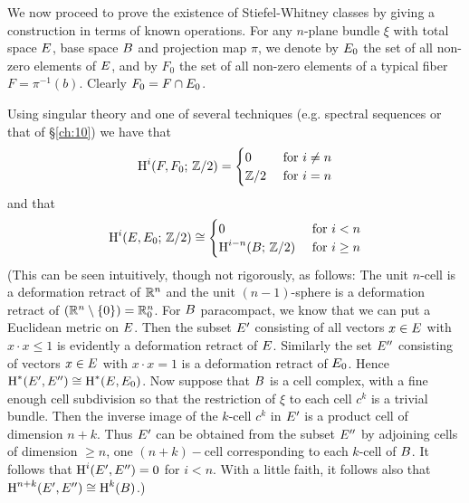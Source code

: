 \documentclass[../main]{subfiles}
\begin{document}
We now proceed to prove the existence of Stiefel-Whitney classes by giving a construction in terms of known operations. For any $n$-plane bundle $\xi$ with total space $E$, base space $B $ and projection map $\pi$, we denote by $E_{0}$ the set of all non-zero elements of $E$, and by $F_{0}$ the set of all non-zero elements of a typical fiber $F=\pi^{-1}(b)$. Clearly $F_{0}= F \cap E_{0}$.

Using singular theory and one of several techniques (e.g. spectral sequences or that of \S\ref{ch:10}) we have that 
\[\operatorname{H}^{i}(F, F_{0} ;\, \mathbb{Z} / 2)=\begin{cases}
	0 &\text { for } i \neq  n  \\
	\mathbb{Z} / 2 &\text { for } i= n 
	\end{cases}
\]
and that
\[\operatorname{H}^{i}(E, E_{0} ; \, \mathbb{Z} / 2)\cong\begin{cases}
	0& \text { for } i<n  \\
	\operatorname{H}^{i-n}(B  ; \, \mathbb{Z} / 2)& \text { for } i \geq  n  
\end{cases}
\]
(This can be seen intuitively, though not rigorously, as follows: The unit $n$-cell is a deformation retract of $\mathbb R^{n}$ and the unit $(n-1)$-sphere is a deformation retract of $(\mathbb R^{ n }\setminus\{0\})=\mathbb R_{0}^{ n } $. For $B $ paracompact, we know that we can put a Euclidean metric on $E$. Then the subset $E^{\prime}$ consisting of all vectors $x \in E$ with $x \cdot x \leq 1$ is evidently a deformation retract of $E$. Similarly the set $E^{\prime \prime}$ consisting of vectors $x \in E$ with $x \cdot x=1$ is a deformation retract of $E_{0} $. Hence $\operatorname{H}^{\ast}(E^{\prime}, E^{\prime \prime}) \cong \operatorname{H}^{\ast}(E, E_{0})$. Now suppose that $B $ is a cell complex, with a fine enough cell subdivision so that the restriction of $\xi$ to each cell $c^{k}$ is a trivial bundle. Then the inverse image of the $k$-cell $ c^{k}$ in $E^{\prime}$ is a product cell of dimension $ n +k$. Thus $E^{\prime}$ can be obtained from the subset $E^{\prime \prime}$ by adjoining cells of dimension $\geq  n $, one $( n +k)-$cell corresponding to each $k$-cell of $B $. It follows that $\operatorname{H}^{i}(E^{\prime}, E^{\prime \prime})=0$ for $i< n $. With a little faith, it follows also that $\operatorname{H}^{ n +k}(E^{\prime}, E^{\prime \prime}) \cong \operatorname{H}^{k}(B )$.)
\end{document}
